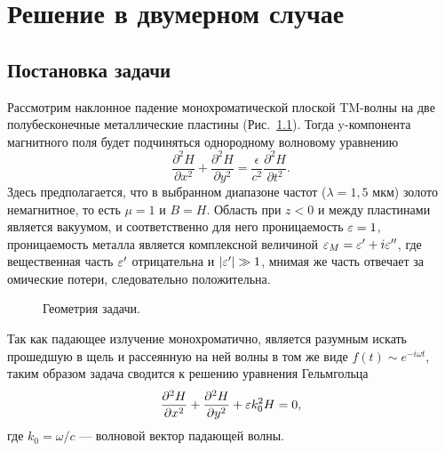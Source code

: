 \chapter{Решение в двумерном случае}
\section{Постановка задачи}
 

 Рассмотрим наклонное падение монохроматической плоской TM-волны на две полубесконечные металлические пластины (Рис.~\ref{fig:geom}). 
 Тогда y-компонента магнитного поля будет подчиняться однородному волновому уравнению 
 \begin{equation}
   \frac{\partial^2 H}{\partial x^2} +   \frac{\partial^2 H}{\partial y^2} = \frac{\epsilon}{c^2}\frac{\partial^2 H}{\partial t^2}.
 \end{equation}
 Здесь предполагается, что в выбранном диапазоне частот ($\lambda = 1,5$ мкм) золото немагнитное, то есть $\mu = 1$ и $B = H$. Область при $z<0$ 
 и между пластинами является вакуумом, и соответственно для него проницаемость $\varepsilon = 1$, проницаемость металла является
 комплексной величиной $\varepsilon_M = \varepsilon' + i \varepsilon''$, где вещественная часть $\varepsilon'$ отрицательна и $\lvert\varepsilon'\rvert \gg 1$, мнимая же часть 
 отвечает за омические потери, следовательно положительна. 
\begin{figure}
\caption{Геометрия задачи.}
\label{fig:geom}
\end{figure}

Так как падающее излучение монохроматично, является разумным искать прошедшую в щель и рассеянную на ней волны в том же виде 
$f(t) \sim e^{-i \omega t}$, таким образом задача сводится к решению уравнения Гельмгольца 
 \begin{equation}
   \frac{\partial^2 H}{\partial x^2} +   \frac{\partial^2 H}{\partial y^2} + \varepsilon k_0^2 H = 0,
   \label{eq:Helmholtz}
 \end{equation}
где $k_0 = \omega/c$ --- волновой вектор падающей волны. 

